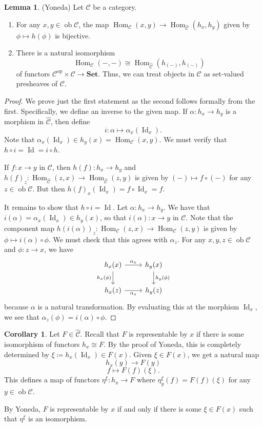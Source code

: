 \documentclass[10pt,letterpaper,cm]{nupset}
\theoremstyle{definition}
\theoremstyle{theorem}
\newtheorem{lemma}[definition]{Lemma}
\newtheorem{corollary}[definition]{Corollary}
\theoremstyle{remark}
\newcommand{\1}{\mathbf{1}}
\renewcommand{\c}{\mathscr{C}}
\newcommand{\0}{\vec 0}
\DeclareMathOperator{\id}{Id}
\DeclareMathOperator{\op}{op}
\DeclareMathOperator{\ob}{ob}
\DeclareMathOperator{\Hom}{Hom}
\begin{document}
\begin{lemma}{(Yoneda)} Let $\c$ be a category.
\begin{enumerate}
\item For any $x, y \in \ob \c$, the map $\Hom_{\c}(x, y) \to \Hom_{\widehat{\c}}(h_x, h_y)$ given by $\phi \mapsto h(\phi)$ is bijective.
\item There is a natural isomorphism $$\Hom_{\c}(-, -) \cong \Hom_{\widehat{\c}}(h_{(-)}, h_{(-)})$$ of functors $ \c^{\op} \times \c \to \mathbf{Set}$. Thus, we can treat objects in $\c$ as set-valued presheaves of $\c$.
\end{enumerate}
\end{lemma}
\begin{proof}
We prove just the first statement as the second follows formally from the first.
Specifically, we define an inverse to the given map. If $\alpha : h_x \to h_y$ is a morphism in $\widehat{\c}$, then define $$i : \alpha \mapsto \alpha_x(\id_x).$$ Note that $\alpha_x(\id_x) \in h_y(x) = \Hom_{\c}(x,y)$. We must verify that $h \circ i = \id = i \circ h$.

\medskip

 If $f: x \to y$ in $\c$, then $h(f) : h_x \to h_y$ and $h(f)_z : \Hom_{\widehat{\c}}(z, x) \to \Hom_{\widehat{\c}}(z, y)$ is given by $(-) \mapsto f \circ (-)$ for any $z\in \ob \c$. But then $h(f)_x(\id_x) = f\circ \id_x = f$.

\medskip

 It remains to show that $h \circ i = \id$. Let $\alpha : h_x \to h_y$.  We have that $
i(\alpha) = \alpha_x(\id_x) \in h_y(x)$, so that $i(\alpha) : x \to y$ in $\c$. Note that the component map $h(i(\alpha))_z : \Hom_{\c}(z, x) \to \Hom_{\c}(z, y)$ is given by $\phi \mapsto i(\alpha) \circ \phi.$ We must check that this agrees with $\alpha_z$. For any $x, y, z \in \ob \c$ and $\phi : z \to x$, we have
\[
\begin{tikzcd}
h_x(x) \arrow[r, "\alpha_x"] \arrow[d, "h_x(\phi)"'] & h_y(x) \arrow[d, "h_y(\phi)"] \\
h_x(z) \arrow[r, "\alpha_z"'] & h_y(z)
\end{tikzcd}
\]
because $\alpha$ is a natural transformation. By evaluating this at the morphism $\id_x$, we see that $\alpha_z(\phi) = i(\alpha) \circ \phi$.
\end{proof}

\begin{corollary}
Let $F \in \widehat{\c}$. Recall that $F$ is representable by $x$ if there is some isomorphism of functors $h_x \cong F$. By the proof of Yoneda, this is completely determined by $\xi\coloneqq h_x(\id_x) \in F(x)$. Given $\xi \in F(x)$, we get a natural map $$h_x(y) \to F(y)$$ $$ f \mapsto F(f)(\xi).$$ This defines a map of functors $\eta^{\xi} : h_x \to F$ where $\eta^{\xi}_y(f) = F(f)(\xi)$ for any $y \in \ob \c$. 

\medskip

 By Yoneda, $F$ is representable by $x$ if and only if there is some $\xi \in F(x)$ such that $\eta^{\xi}$ is an isomorphism. 
\end{corollary}
\end{document}
